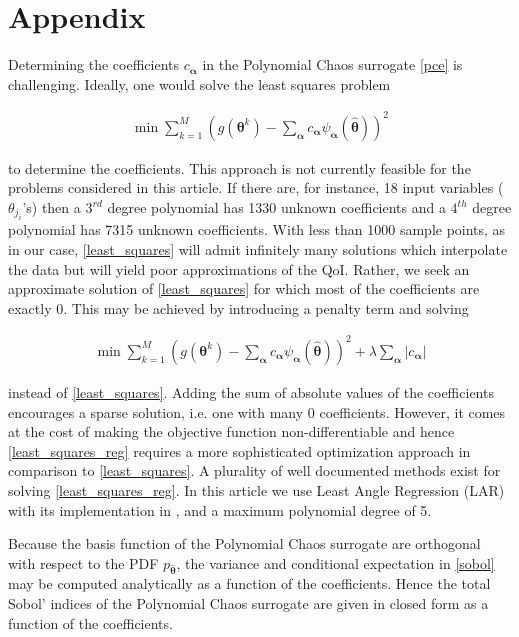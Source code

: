 \documentclass[smallextended]{svjour3}
\numberwithin{equation}{section}
\begin{document}
\section*{Appendix}

Determining the coefficients $c_{\boldsymbol{\alpha}}$ in the Polynomial Chaos surrogate \eqref{pce} is challenging. Ideally, one would solve the least squares problem
\begin{ceqn}
\begin{eqnarray}
\label{least_squares}
\min \sum\limits_{k=1}^M \left(g(\boldsymbol{\theta}^k)-\sum_{\boldsymbol{\alpha}} c_{\boldsymbol{\alpha}} \psi_{\boldsymbol{\alpha}}(\hat{\boldsymbol{\theta}}) \right)^2 \tag{A.1}
\end{eqnarray}
\end{ceqn}
to determine the coefficients. This approach is not currently feasible for the problems considered in this article. If there are, for instance, 18 input variables ($\theta_{j_i}$'s) then a $3^{rd}$ degree polynomial has 1330 unknown coefficients and a $4^{th}$ degree polynomial has 7315 unknown coefficients. With less than 1000 sample points, as in our case, \eqref{least_squares} will admit infinitely many solutions which interpolate the data but will yield poor approximations of the QoI. Rather, we seek an approximate solution of \eqref{least_squares} for which most of the coefficients are exactly 0. This may be achieved by introducing a penalty term and solving
\begin{ceqn}
\begin{eqnarray}
\label{least_squares_reg}
\min \sum\limits_{k=1}^M \left(g(\boldsymbol{\theta}^k)-\sum_{\boldsymbol{\alpha}} c_{\boldsymbol{\alpha}} \psi_{\boldsymbol{\alpha}}(\hat{\boldsymbol{\theta}}) \right)^2 + \lambda \sum_{\boldsymbol{\alpha}} \vert c_{\boldsymbol{\alpha}} \vert \tag{A.2}
\end{eqnarray}
\end{ceqn}
instead of \eqref{least_squares}. Adding the sum of absolute values of the coefficients encourages a sparse solution, i.e. one with many 0 coefficients. However, it comes at the cost of making the objective function non-differentiable and hence \eqref{least_squares_reg} requires a more sophisticated optimization approach in comparison to \eqref{least_squares}. A plurality of well documented methods exist for solving \eqref{least_squares_reg}. In this article we use Least Angle Regression (LAR) \cite{lar} with its implementation in \cite{uqlab}, and a maximum polynomial degree of 5.

Because the basis function of the Polynomial Chaos surrogate are orthogonal with respect to the PDF $p_{\hat{\boldsymbol{\theta}}}$, the variance and conditional expectation in \eqref{sobol} may be computed analytically as a function of the coefficients. Hence the total Sobol' indices of the Polynomial Chaos surrogate are given in closed form as a function of the coefficients. 


 

\end{document}
